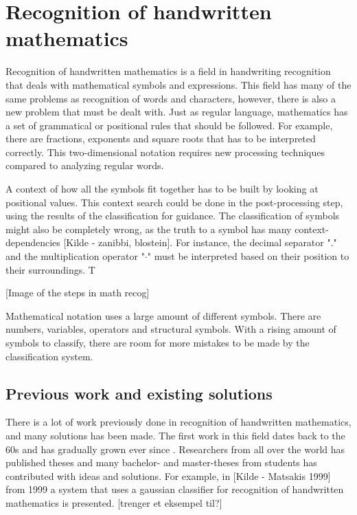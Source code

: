 \section{Recognition of handwritten mathematics} 
\label{recognition_of_handwritten_mathematics}
Recognition of handwritten mathematics is a field in handwriting recognition that deals with mathematical symbols and expressions. This field has many of the same problems as recognition of words and characters, however, there is also a new problem that must be dealt with. Just as regular language, mathematics has a set of grammatical or positional rules that should be followed. For example, there are fractions, exponents and square roots that has to be interpreted correctly. This two-dimensional notation requires new processing techniques compared to analyzing regular words.

A context of how all the symbols fit together has to be built by looking at positional values. This context search could be done in the post-processing step, using the results of the classification for guidance. The classification of symbols might also be completely wrong, as the truth to a symbol has many context-dependencies [Kilde - zanibbi, blostein]. For instance, the decimal separator "." and the multiplication operator "$\cdot$" must be interpreted based on their position to their surroundings. T

\begin{figure}[H]
  \centering
  \label{steps_in_math_recog}
\end{figure}
[Image of the steps in math recog]

Mathematical notation uses a large amount of different symbols. There are numbers, variables, operators and structural symbols. With a rising amount of symbols to classify, there are room for more mistakes to be made by the classification system.

\subsection{Previous work and existing solutions}
\label{previous_work_existing_solutions}
There is a lot of work previously done in recognition of handwritten mathematics, and many solutions has been made. The first work in this field dates back to the 60s and has gradually grown ever since \cite{mouchere_icfhr2016_2016}. Researchers from all over the world has published theses and many bachelor- and master-theses from students has contributed with ideas and solutions. For example, in [Kilde - Matsakis 1999] from 1999 a system that uses a gaussian classifier for recognition of handwritten mathematics is presented. [trenger et eksempel til?]

